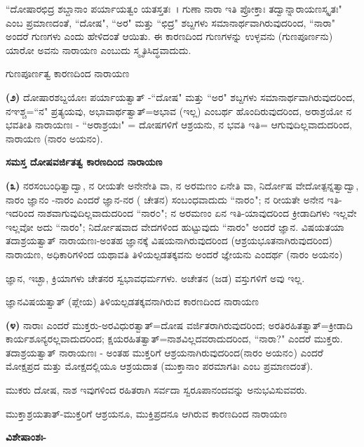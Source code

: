 ``ದೋಷಾರಛಿದ್ರ ಶಬ್ದಾನಾಂ ಪರ್ಯಾಯತ್ವಂ ಯತಸ್ತತಃ~। ಗುಣಾ ನಾರಾ ಇತಿ ಪ್ರೋಕ್ತಾಃ ತದ್ವಾನ್ನಾರಾಯಣಸ್ಕೃತಃ" ಎಂಬ ಪ್ರಮಾಣದಂತೆ, ``ದೋಷ", ``ಅರ" ಮತ್ತು ``ಛಿದ್ರ" ಶಬ್ದಗಳು ಸಮಾನಾರ್ಥವಾಗಿರುವುದರಿಂದ, ``ನಾರಾ" ಅಂದರೆ ಗುಣಗಳು ಎಂದು ಹೇಳಿದಂತೆ ಆಯಿತು. ಈ ಕಾರಣದಿಂದ ಗುಣಗಳನ್ನು ಉಳ್ಳವನು (ಗುಣಪೂರ್ಣನು) ಯಾರೋ ಅವನು ನಾರಾಯಣ ಎಂಬುದು ಸ್ಮೃತಿಸಿದ್ಧವಾದುದು.

\begin{center}
ಗುಣಪೂರ್ಣತ್ವ ಕಾರಣದಿಂದ ನಾರಾಯಣ
\end{center}

\textbf{(೨)} ದೋಷಾರಶಬ್ದಯೋಃ ಪರ್ಯಾಯತ್ವಾತ್ -``ದೋಷ" ಮತ್ತು ``ಅರ" ಶಬ್ದಗಳು ಸಮಾನಾರ್ಥವಾಗಿರುವುದರಿಂದ, ನಞಶ್ಚ=``ನ" ಪ್ರತ್ಯಯವು, ಅಭಾವಾರ್ಥತ್ವಾತ್=ಅಭಾವ (ಇಲ್ಲ) ಎಂಬರ್ಥ ಹೊಂದಿರುವುದರಿಂದ, ಅರಾಶ್ರಯೋ ನ ಭವತೀತಿ ನಾರಾಯಣಃ - ``ಅರಾಶ್ರಯಃ" = ದೋಷಗಳಿಗೆ ಆಶ್ರಯನು, ನ ಭವತಿ ಇತಿ= ಆಗುವುದಿಲ್ಲವಾದುದರಿಂದ, ನಾರಾಯಣ (ನಾರಂ ಅಯನಂ).

\begin{center}
\textbf{ಸಮಸ್ತ ದೋಷವರ್ಜಿತತ್ವ ಕಾರಣದಿಂದ ನಾರಾಯಣ}
\end{center}

\textbf{(೩)} ನರಸಂಬಂಧಿತ್ವಾದ್ವಾ, ನ ರೀಯತೇ ಅನೇನೇತಿ ವಾ, ನ ಅರಮಣಂ ಏನೇತಿ ವಾ, ನಿರ್ದೋಷ ವೇದೋತ್ಪನ್ನತ್ವಾದ್ವಾ, ನಾರಂ ಜ್ಞಾನಂ -ನಾರಂ ಎಂದರೆ ಜ್ಞಾನ-ನರ ( ಚೇತನ) ಸಂಬಂಧವಾದುದು ``ನಾರ೦"; ನ ರೀಯತೇ ಅನೇನ ಇತಿ-ಇದರಿಂದ ನಾಶವಾಗುವುದಿಲ್ಲವಾದುದರಿಂದ ``ನಾರ೦"; ನ ಅರಮಣಂ ಏನ ಇತಿ-ಯಾವುದರಿಂದ ಕ್ರೀಡಾದಿಗಳು ಇಲ್ಲವೇ ಇಲ್ಲವೋ ಅದು ``ನಾರಂ"; ನಿರ್ದೋಷವಾದ ವೇದಗಳಿಂದ ಹುಟ್ಟುವುದು ``ನಾರಂ" ಅಂದರೆ ಜ್ಞಾನ. ವಿಷಯತಯಾ ತದಾಶ್ರಯತ್ವಾತ್ ನಾರಾಯಣಃ-ಅಂತಹ ಜ್ಞಾನಕ್ಕೆ ವಿಷಯನಾಗಿರುವುದರಿಂದ (ಆಶ್ರಯಭೂತನಾಗಿರುವುದರಿಂದ) ನಾರಾಯಣ, ಅಧಿಕಾರಿಗಳಿಂದ ಯಥಾವತಿ ತಿಳಿಯಲ್ಪಡತಕ್ಕವನು ಅಂದರೆ ಜ್ಞೇಯನು ಎಂದರ್ಥ (ನಾರಂ ಅಯನಂ)

ಜ್ಞಾನ, ಇಚ್ಛಾ, ಕ್ರಿಯಾಗಳು ಚೇತನರ ಸ್ವಭಾವಧರ್ಮಗಳು. ಅಚೇತನ (ಜಡ) ವಸ್ತುಗಳಿಗೆ ಅವು ಇಲ್ಲ.

\begin{center}
ಜ್ಞಾನವಿಷಯತ್ವಾತ್ (ಪ್ಲೇಯ) ತಿಳಿಯಲ್ಪಡತಕ್ಕವನಾಗಿರುವ ಕಾರಣದಿಂದ ನಾರಾಯಣ
\end{center}

\textbf{(೪)} ನಾರಾಃ ಎಂದರೆ ಮುಕ್ತರು-ಅರವಿಧುರತ್ವಾತ್=ದೋಷ ವರ್ಜಿತರಾಗಿರುವುದರಿಂದ; ಅರತಿರಹಿತತ್ವಾತ್=ಕ್ರೀಡಾದಿ ಕಾರ್ಯಶೂನ್ಯರಲ್ಲವಾದುದರಿಂದ; ಕ್ಷಯರಹಿತತ್ವಾತ್=ನಾಶವಿಲ್ಲದವರಾದುದರಿಂದ, ``ನಾರಾ?" ಎಂದರೆ ಮುಕ್ತರು. ತದಾಶ್ರಯತ್ವಾತ್ ನಾರಾಯಣಃ - ಅಂತಹ ಮುಕ್ತರಿಗೆ ಆಶ್ರಯನಾಗಿರುವುದರಿಂದ(ನಾರಂ ಅಯನ೦) ಎಂದರೆ ಮೋಕ್ಷಪ್ರದ ಮತ್ತು ಮೋಕ್ಷದಲ್ಲಿಯೂ ಆಶ್ರಯದಾತ (ಮುಕ್ತಾನಾಂ ಪರಮಾಗತಿಃ ಎಂಬ ಪ್ರಮಾಣದಂತೆ).

ಮುಕರು ದೋಷ, ನಾಶ ಇವುಗಳಿಂದ ರಹಿತರಾಗಿ ಸರ್ವದಾ ಸ್ವರೂಪಾನಂದವನ್ನು ಅನುಭವಿಸುವವರು.

\begin{center}
ಮುಕ್ತಾಶ್ರಯತಾತ್-ಮುಕ್ತರಿಗೆ ಆಶ್ರಯನೂ, ಮುಕ್ತಿಪ್ರದನೂ ಆಗಿರುವ ಕಾರಣದಿಂದ ನಾರಾಯಣ
\end{center}

\noindent
\textbf{ವಿಶೇಷಾಂಶಃ-}

